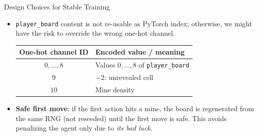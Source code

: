 \begin{frame}{Design Choices for Stable Training}
    \begin{itemize}
        \item \texttt{player\_board} content is not re-usable as PyTorch index; otherwise, we might have the risk to override the wrong one-hot channel.
              \vspace{0.8em}
              \begin{table}[h]
                  \centering
                  \begin{tabular}{cl}
                      \textbf{One-hot channel ID} & \textbf{Encoded value / meaning}              \\
                      \midrule
                      $0,\ldots,8$                & Values $0,\ldots,8$ of \texttt{player\_board} \\
                      $9$                         & $-2$: unrevealed cell                         \\
                      $10$                        & Mine density                                  \\
                      \bottomrule
                  \end{tabular}
              \end{table}
              \vspace{0.8em}
        \item \textbf{Safe first move}: if the first action hits a mine, the
              board is regenerated from the same RNG (not reseeded) until the
              first move is safe. This avoids penalizing the agent only due to \textit{its
                  bad luck}.
    \end{itemize}
\end{frame}

